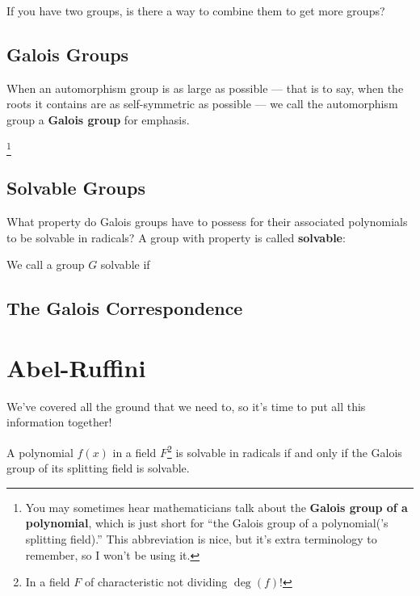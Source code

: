 If you have two groups, is there a way to combine them to get more groups?

\subsection{Galois Groups}

When an automorphism group is as large as possible --- that is to say, when the roots it contains are as self-symmetric as possible --- we call the automorphism group a \textbf{Galois group} for emphasis.

\footnote{You may sometimes hear mathematicians talk about the \textbf{Galois group of a polynomial}, which is just short for ``the Galois group of a polynomial('s splitting field).'' This abbreviation is nice, but it's extra terminology to remember, so I won't be using it.}

\subsection{Solvable Groups}

What property do Galois groups have to possess for their associated polynomials to be solvable in radicals? A group with property is called \textbf{solvable}:

\begin{definition}
    We call a group $G$ solvable if
\end{definition}



\subsection{The Galois Correspondence}

\section{Abel-Ruffini}

We've covered all the ground that we need to, so it's time to put all this information together!

\begin{theorem}
    A polynomial $f(x)$ in a field $F$\footnote{In a field $F$ of characteristic not dividing $\deg(f)!$} is solvable in radicals if and only if the Galois group of its splitting field is solvable.
\end{theorem}

